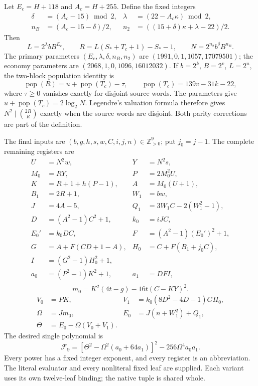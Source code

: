 Let $E_c=H+118$ and $A_c=H+255$. Define the fixed integers
\begin{align*}
 \delta&=(A_c-15)\bmod2,&
 \lambda&=(22-A_c\kappa)\bmod2,\\
 n_B&=(A_c-15-\delta)/2,&
 n_2&=((15+\delta)\kappa+\lambda-22)/2.
\end{align*}
Then
\[
 L=2^\lambda bB^{E_c},\qquad
 R=L(S_*+T_c+1)-S_*-1,\qquad N=2^{n_2}b^\delta B^{n_B}.
\]
The primary parameters $(E_c,\lambda,\delta,n_B,n_2)$ are
$(1991,0,1,1057,17079501)$; the economy parameters are
$(2068,1,0,1096,16012032)$.
If $b=2^k$, $B=2^v$, $L=2^u$, the two-block population identity is
\[
 \operatorname{pop}(R)=u+\operatorname{pop}(T_c)-\tau,
 \qquad \operatorname{pop}(T_c)=139v-31k-22,
\]
where $\tau\ge0$ vanishes exactly for disjoint source words. The parameters
give $u+\operatorname{pop}(T_c)=2\log_2N$. Legendre's valuation formula
therefore gives $N^2\mid\binom{2R}{R}$ exactly when the source words are
disjoint. Both parity corrections are part of the definition.

The final inputs are $(b,g,h,s,w,C,i,j,n)\in\mathbb Z_{>0}^9$;
put $j_0=j-1$. The complete remaining registers are
\begin{align*}
 U&=N^2w,&Y&=N^2s,\\
 M_0&=RY,&P&=2M_0^2U,\\
 K&=R+1+h(P-1),& A&=M_0(U+1),\\
 B_1&=2R+1,& W_1&=bw,\\
 J&=4A-5,&Q_1&=3W_1C-2(W_1^2-1),\\
 D&=(A^2-1)C^2+1,& k_0&=iJC,\\
 E_0'&=k_0DC,&F&=(A^2-1)(E_0')^2+1,\\
 G&=A+F(CD+1-A),&H_0&=C+F(B_1+j_0C),\\
 I&=(G^2-1)H_0^2+1,\\
 a_0&=(P^2-1)K^2+1,&a_1&=DFI,\\
\end{align*}
\[
 m_0=K^2(4t-g)-16t(C-KY)^2.
\]
\begin{align*}
 V_0&=PK,&V_1&=k_0(8D^2-4D-1)GH_0,\\
 \Omega&=Jm_0,& E_0&=J(n+W_1^2)+Q_1,\\
 \Theta&=E_0-\Omega(V_0+V_1).
\end{align*}
The desired single polynomial is
\begin{equation}\label{eq:new-nine}
 \boxed{\mathcal F_9=
  [\Theta^2-\Omega^2(a_0+64a_1)]^2
      -256\Omega^4a_0a_1.}
\end{equation}
Every power has a fixed integer exponent, and every register is an
abbreviation. The literal evaluator and every nonliteral fixed leaf are
supplied. Each variant uses its own twelve-leaf binding; the native tuple is
shared whole.

